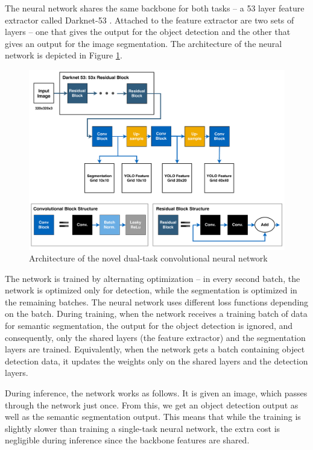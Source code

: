 \documentclass{ctuthesis/ctuthesis}
\begin{document}
The neural network shares the same backbone for both tasks -- a 53 layer feature extractor called Darknet-53 \cite{YOLOv3}. Attached to the feature extractor are two sets of layers -- one that gives the output for the object detection and the other that gives an output for the image segmentation. The architecture of the neural network is depicted in Figure \ref{f:dual_task}.\par


\begin{figure}[]
    \centering
    \includegraphics[width=1\textwidth]{images/network_architecture.pdf}
    
    \caption{Architecture of the novel dual-task convolutional neural network}\label{f:dual_task}
\end{figure}



The network is trained by alternating optimization -- in every second batch, the network is optimized only for detection, while the segmentation is optimized in the remaining batches. The neural network uses different loss functions depending on the batch. During training, when the network receives a training batch of data for semantic segmentation, the output for the object detection is ignored, and consequently, only the shared layers (the feature extractor) and the segmentation layers are trained. Equivalently, when the network gets a batch containing object detection data, it updates the weights only on the shared layers and the detection layers. \par


During inference, the network works as follows. It is given an image, which passes through the network just once. From this, we get an object detection output as well as the semantic segmentation output. This means that while the training is slightly slower than training a single-task neural network, the extra cost is negligible during inference since the backbone features are shared. \par
\end{document}
